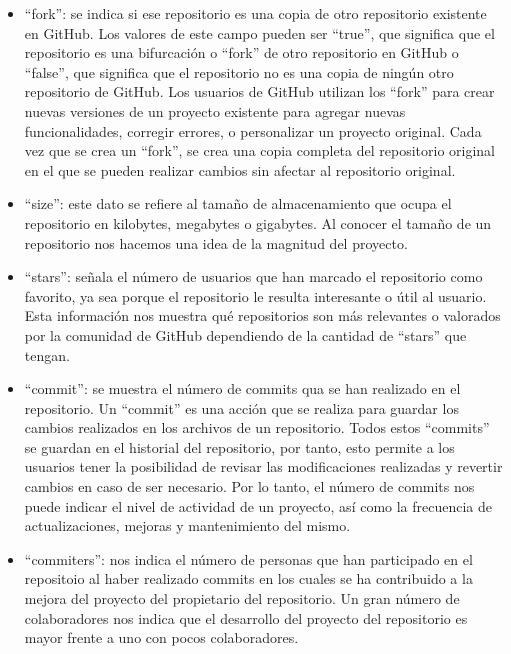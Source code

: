 \documentclass[a4paper, 12pt]{book}
\begin{document}
\begin{itemize}
  \item ``fork'': se indica si ese repositorio es una copia de otro repositorio existente en GitHub. 
  Los valores de este campo pueden ser ``true'', que significa que el repositorio es una bifurcación o ``fork'' de otro repositorio en GitHub o ``false'', que significa que el repositorio no es una copia de ningún otro repositorio de GitHub.
  Los usuarios de GitHub utilizan los ``fork'' para crear nuevas versiones de un proyecto existente para agregar nuevas funcionalidades, corregir errores, o personalizar un proyecto original.
  Cada vez que se crea un ``fork'', se crea una copia completa del repositorio original en el que se pueden realizar cambios sin afectar al repositorio original.
  
  \item ``size'': este dato se refiere al tamaño de almacenamiento que ocupa el repositorio en kilobytes, megabytes o gigabytes.  
  Al conocer el tamaño de un repositorio nos hacemos una idea de la magnitud del proyecto.

  \item ``stars'': señala el número de usuarios que han marcado el repositorio como favorito, ya sea porque el repositorio le resulta interesante o útil al usuario.
  Esta información nos muestra qué repositorios son más relevantes o valorados por la comunidad de GitHub dependiendo de la cantidad de ``stars'' que tengan.

  \item ``commit'': se muestra el número de commits qua se han realizado en el repositorio.
  Un ``commit'' es una acción que se realiza para guardar los cambios realizados en los archivos de un repositorio.
  Todos estos ``commits'' se guardan en el historial del repositorio, por tanto, esto permite a los usuarios tener la posibilidad de revisar las modificaciones realizadas y revertir cambios en caso de ser necesario. 
  Por lo tanto, el número de commits nos puede indicar el nivel de actividad de un proyecto, así como la frecuencia de actualizaciones, mejoras y mantenimiento del mismo.

  \item ``commiters'': nos indica el número de personas que han participado en el repositoio al haber realizado commits en los cuales se ha contribuido a la mejora del proyecto del propietario del repositorio.
  Un gran número de colaboradores nos indica que el desarrollo del proyecto del repositorio es mayor frente a uno con pocos colaboradores.
  
\end{itemize} 
\end{document}
